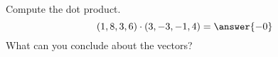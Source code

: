 \begin{problem}
Compute the dot product.
\[
(1,8,3,6)\cdot(3,-3,-1,4)=\answer{-0}
\]
What can you conclude about the vectors?
\begin{multipleChoice}
\end{multipleChoice}
\end{problem}